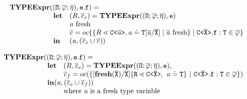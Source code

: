 \documentclass[a4paper,USenglish,cleveref, autoref, thm-restate]{lipics-v2021}
\begin{document}
\begin{gather*}
  \begin{array}{@{}l@{}l}
    \typeExpr{} &(\typeAssumptions, \texttt{e}.\texttt{f}) = \\
                & \begin{array}{ll}
                    \textbf{let} 
                    & ({R}, \consSet_e) = \typeExpr(\typeAssumptions, \texttt{e})\\
                    & \tv{a} \text{ fresh} \\
                    & \consSet = \orCons\set{
                      \set{
                      {R} \lessdot \exptype{C}{\ol{\tv{a}}} , \tv{a} \doteq
                      \type{T}[\overline{\tv{a}}/\ol{X}]
                      \mid \overline{\tv{a}} \text{ fresh}
                      }
                      \mid \exptype{C}{\ol{X}}.\mv{f} : \mv{T} \in \ol{\fieldAssumption}
                      }\\
                    {\mathbf{in}} & {
                    (\tv{a}, (\consSet_e \cup \constraints))}
                  \end{array} 
  \end{array}
\end{gather*}

\noindent
$\begin{array}{@{}l@{}l}
\typeExpr{} &(\typeAssumptions, \texttt{e}.\texttt{f}) = \\
& \begin{array}{ll}
\textbf{let} 
& ({R}, \consSet_e) = \typeExpr(\typeAssumptions, \texttt{e}),\\
& \consSet_f = \orCons{}(\set{[\textbf{fresh}(\ol{X})/\ol{X}]\set{\type{R} \lessdot \exptype{C}{\ol{X}},\ \tv{a} \doteq \type{T}} \ |\ \exptype{C}{\ol{X}}.\texttt{f} : \type{T} \in \ol{\fieldAssumption}})\\
\multicolumn{2}{l}{\mathbf{in}
(\tv{a}, (\consSet_e \cup \consSet_f))}\\
& \text{where\ } \tv{a} \text{\ is\ a\ fresh\
  type\ variable}\\ 
\end{array} \\
\end{array}
$

\smallskip
\end{document}
